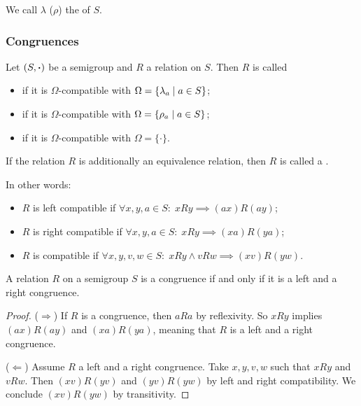 \begin{definition}
We call $\lambda$ ($\rho$) the  of $S$.
\end{definition}

\subsubsection{Congruences}
\begin{definition}
Let $\sSet{S,\boldsymbol{\cdot}}$ be a semigroup and $R$ a relation on $S$. Then $R$ is called
\begin{itemize}
\item {} if it is $\Omega$-compatible with $\Omega = \setbuilder{\lambda_a}{a\in S}$;
\item {} if it is $\Omega$-compatible with $\Omega = \setbuilder{\rho_a}{a\in S}$;
\item {} if it is $\Omega$-compatible with $\Omega = \{\boldsymbol{\cdot}\}$.
\end{itemize}
If the relation $R$ is additionally an equivalence relation, then $R$ is called a .
\end{definition}

In other words:
\begin{itemize}
\item $R$ is left compatible if $\forall x,y,a\in S: \; xRy \implies (ax)R(ay)$;
\item $R$ is right compatible if $\forall x,y,a\in S: \; xRy \implies (xa)R(ya)$;
\item $R$ is compatible if $\forall x,y,v,w\in S: \; xRy \land vRw \implies (xv)R(yw)$.
\end{itemize}

\begin{proposition}
A relation $R$ on a semigroup $S$ is a congruence \textup{if and only if} it is a left and a right congruence.
\end{proposition}
\begin{proof}
($\Rightarrow$) If $R$ is a congruence, then $aRa$ by reflexivity. So $xRy$ implies $(ax)R(ay)$ and $(xa)R(ya)$, meaning that $R$ is a left and a right congruence.

($\Leftarrow$) Assume $R$ a left and a right congruence. Take $x,y,v,w$ such that $xRy$ and $vRw$. Then $(xv)R(yv)$ and $(yv)R(yw)$ by left and right compatibility. We conclude $(xv)R(yw)$ by transitivity.
\end{proof}

